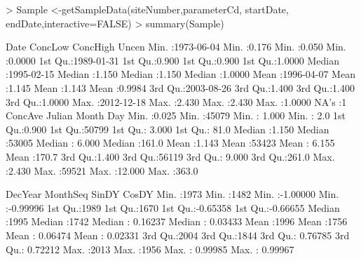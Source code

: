 \documentclass[a4paper,11pt]{article}
\begin{document}
\begin{Schunk}
\begin{Sinput}
> Sample <-getSampleData(siteNumber,parameterCd,
       startDate, endDate,interactive=FALSE)
> summary(Sample)
\end{Sinput}
\begin{Soutput}
      Date               ConcLow         ConcHigh         Uncen       
 Min.   :1973-06-04   Min.   :0.176   Min.   :0.050   Min.   :0.0000  
 1st Qu.:1989-01-31   1st Qu.:0.900   1st Qu.:0.900   1st Qu.:1.0000  
 Median :1995-02-15   Median :1.150   Median :1.150   Median :1.0000  
 Mean   :1996-04-07   Mean   :1.145   Mean   :1.143   Mean   :0.9984  
 3rd Qu.:2003-08-26   3rd Qu.:1.400   3rd Qu.:1.400   3rd Qu.:1.0000  
 Max.   :2012-12-18   Max.   :2.430   Max.   :2.430   Max.   :1.0000  
                      NA's   :1                                       
    ConcAve          Julian          Month             Day       
 Min.   :0.025   Min.   :45079   Min.   : 1.000   Min.   :  2.0  
 1st Qu.:0.900   1st Qu.:50799   1st Qu.: 3.000   1st Qu.: 81.0  
 Median :1.150   Median :53005   Median : 6.000   Median :161.0  
 Mean   :1.143   Mean   :53423   Mean   : 6.155   Mean   :170.7  
 3rd Qu.:1.400   3rd Qu.:56119   3rd Qu.: 9.000   3rd Qu.:261.0  
 Max.   :2.430   Max.   :59521   Max.   :12.000   Max.   :363.0  
                                                                 
    DecYear        MonthSeq        SinDY              CosDY         
 Min.   :1973   Min.   :1482   Min.   :-1.00000   Min.   :-0.99996  
 1st Qu.:1989   1st Qu.:1670   1st Qu.:-0.65358   1st Qu.:-0.66655  
 Median :1995   Median :1742   Median : 0.16237   Median : 0.03433  
 Mean   :1996   Mean   :1756   Mean   : 0.06474   Mean   : 0.02331  
 3rd Qu.:2004   3rd Qu.:1844   3rd Qu.: 0.76785   3rd Qu.: 0.72212  
 Max.   :2013   Max.   :1956   Max.   : 0.99985   Max.   : 0.99967  
\end{Soutput}
\end{Schunk}
\end{document}
